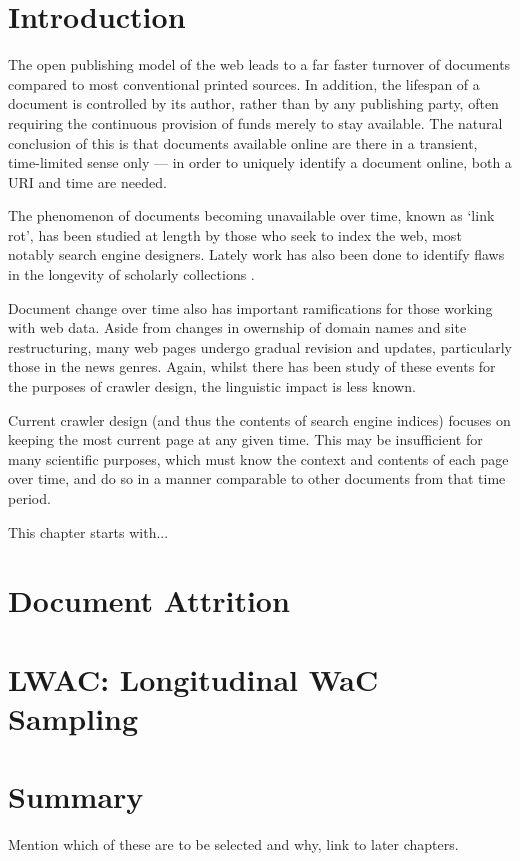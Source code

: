 
\section{Introduction}
\label{sec:longitudinal:introduction}
The open publishing model of the web leads to a far faster turnover of documents compared to most conventional printed sources.  In addition, the lifespan of a document is controlled by its author, rather than by any publishing party, often requiring the continuous provision of funds merely to stay available.  The natural conclusion of this is that documents available online are there in a transient, time-limited sense only --- in order to uniquely identify a document online, both a URI and time are needed.

The phenomenon of documents becoming unavailable over time, known as `link rot', has been studied at length by those who seek to index the web, most notably search engine designers.  Lately work has also been done to identify flaws in the longevity of scholarly collections .

Document change over time also has important ramifications for those working with web data.  Aside from changes in owernship of domain names and site restructuring, many web pages undergo gradual revision and updates, particularly those in the news genres.  Again, whilst there has been study of these events for the purposes of crawler design, the linguistic impact is less known.

Current crawler design (and thus the contents of search engine indices) focuses on keeping the most current page at any given time.  This may be insufficient for many scientific purposes, which must know the context and contents of each page over time, and do so in a manner comparable to other documents from that time period.

This chapter starts with...


\section{Document Attrition}
\label{sec:longitudinal:attrition}




\section{LWAC: Longitudinal WaC Sampling}
\label{sec:longitudinal:lwac}





\section{Summary}
\label{sec:longitudinal:summary}
Mention which of these are to be selected and why, link to later chapters.
